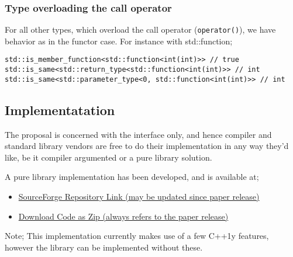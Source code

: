 \subsubsection{Type overloading the call operator}
For all other types, which overload the call operator (\verb|operator()|), we have
behavior as in the functor case. For instance with std::function;
\begin{verbatim}
std::is_member_function<std::function<int(int)>> // true
std::is_same<std::return_type<std::function<int(int)>> // int
std::is_same<std::parameter_type<0, std::function<int(int)>> // int
\end{verbatim}

\subsection{Implementatation}
The proposal is concerned with the interface only, and hence compiler and
standard library vendors are free to do their implementation in any way they'd
like, be it compiler argumented or a pure library solution.

A pure library implementation has been developed, and is available at;
\begin{itemize}
\item \href{https://sourceforge.net/p/calltraits/code/ci/default/tree/code/combined/}
    {SourceForge Repository Link (may be updated since paper release)}
\item \href{http://sourceforge.net/code-snapshots/hg/c/ca/calltraits/code/calltraits-code-b1755248eaf854ea9cd0ef054cfb157de1b09daf.zip}
    {Download Code as Zip (always refers to the paper release)}
\end{itemize}
Note; This implementation currently makes use of a few C++1y features, however
the library can be implemented without these.
